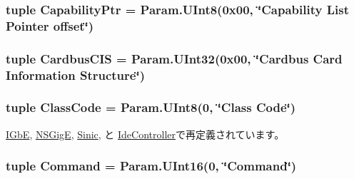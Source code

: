 \label{classPci_1_1PciDevice_a5aa1725bb5acbc487d1870539a3d6104}
\hypertarget{classPci_1_1PciDevice_abd17d68ce809f43df0fb34c342d84464}{
\subsubsection[{CapabilityPtr}]{\setlength{\rightskip}{0pt plus 5cm}tuple {\bf CapabilityPtr} = Param.UInt8(0x00, \char`\"{}Capability List Pointer offset\char`\"{})}}
\label{classPci_1_1PciDevice_abd17d68ce809f43df0fb34c342d84464}
\hypertarget{classPci_1_1PciDevice_aaab5b5626899d7883cd5f10928a5361c}{
\subsubsection[{CardbusCIS}]{\setlength{\rightskip}{0pt plus 5cm}tuple {\bf CardbusCIS} = Param.UInt32(0x00, \char`\"{}Cardbus Card Information Structure\char`\"{})}}
\label{classPci_1_1PciDevice_aaab5b5626899d7883cd5f10928a5361c}
\hypertarget{classPci_1_1PciDevice_a9222bb7cddf99c695b0430f560974967}{
\subsubsection[{ClassCode}]{\setlength{\rightskip}{0pt plus 5cm}tuple {\bf ClassCode} = Param.UInt8(0, \char`\"{}Class Code\char`\"{})}}
\label{classPci_1_1PciDevice_a9222bb7cddf99c695b0430f560974967}


\hyperlink{classEthernet_1_1IGbE_a7d0125d1930fad943a6a7471da0317ad}{IGbE}, \hyperlink{classEthernet_1_1NSGigE_a7d0125d1930fad943a6a7471da0317ad}{NSGigE}, \hyperlink{classEthernet_1_1Sinic_a7d0125d1930fad943a6a7471da0317ad}{Sinic}, と \hyperlink{classIde_1_1IdeController_a7d0125d1930fad943a6a7471da0317ad}{IdeController}で再定義されています。\hypertarget{classPci_1_1PciDevice_a46090a927141f497918fd0c87f782395}{
\subsubsection[{Command}]{\setlength{\rightskip}{0pt plus 5cm}tuple {\bf Command} = Param.UInt16(0, \char`\"{}Command\char`\"{})}}
\label{classPci_1_1PciDevice_a46090a927141f497918fd0c87f782395}


